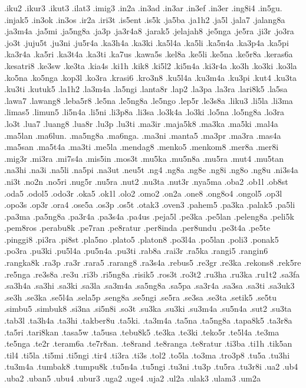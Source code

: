 {.iku2 .ikur3 .ikut3 .ilat3 .imig3 .in2a .in3ad .in3ar .in3ef .in3er
.ing8i4 .in5gu. .injak5 .in3ok .in3os .ir2a .iri3t .is5ent .is5k .ja5ba
.ja1h2 .ja5l .jala7 .jalang8a .ja3m4a .ja5mi .ja5ng8a .ja3p .ja3r4a8
.jarak5 .jelajah8 .je5nga .je5ra .ji3r .jo3ra .jo3t .juju5t .ju3ni .ju5r4a
.ka3h4a .ka3ki .ka5l4a .ka5li .ka5n4a .ka3p4a .ka5pi .ka3r4a .ka5ri
.ka3t4a .ka3ti .ka7us .kawa5s .kel8a .ke5li .ke5na .ke5r8a .keras6a
.kesatri8 .ke3sw .ke3ta .kia4s .ki1h .kik8 .ki5l2 .ki5n4a .ki3r4a .ko3h
.ko3ki .ko3la .ko5na .ko5nga .kop3l .ko3ra .krasi6 .kro3n8 .ku5l4a .ku3m4a
.ku3pi .kut4 .ku3ta .ku3ti .kutuk5 .la1h2 .la3m4a .la5ngi .lanta8r .lap2
.la3pa .la3ra .lari8k5 .la5sa .lawa7 .lawang8 .leba5r8 .le5na .le5ng8a
.le5ngo .lep5r .le3s8a .liku3 .li5la .li3ma .limas5 .limun5 .li5n4a .li5ni
.li3p8a .li3sa .lo3k4a .lo3ki .lo5na .lo5ng8a .lo3ra .lo3t .lua7 .luang8
.lua8r .lu3p .lu3ti .ma3ir .maja5k8 .ma3ka .ma5ki .mal4a .ma5lan .ma6lun.
.ma5ng8a .ma6nga. .ma3ni .manta5 .ma3pr .ma3ra .mas4a .ma5san .ma5t4a
.ma3ti .me5la .mendag8 .menko5 .menkom8 .mer8a .mer8i .mig3r .mi3ra
.mi7s4a .mis5in .mos3t .mu5ka .mu5n8a .mu5ra .mut4 .mu5tan .na3hi .na3i
.na5li .na5pi .na3ut .neu5t .ng4 .ng8a .ng8e .ng8i .ng8o .ng8u .ni3s4a
.ni3t .no2n .no5ri .nug5r .nu5ra .nut2 .nu3ta .nut3r .nya5ma .oba2 .ob1l
.ob8st .oda5 .odol5 .odo3r .oka5 .ok1l .olo2 .omo2 .on2a .one8 .ong8o4
.ongol5 .op3l .opo3s .op3r .ora4 .ose5a .os3p .os5t .otak3 .oven3 .pahem5
.pa3ka .palak5 .pa5li .pa3ma .pa5ng8a .pa3r4a .pa3s4a .pa4us .peja5l
.pe3ka .pe5lan .peleng8a .peli5k .pem8ros .perabu8k .pe7ran .pe8ratur
.per8inda .per8undu .pe3t4a .pe5te .pinggi8 .pi3ra .pi8st .pla5no .plato5
.platon8 .po3l4a .po5lan .poli3 .ponak5 .po3ra .pu3ki .pu5l4a .pu5n4a
.pu3ti .rab8a .rai3r .ra5ka .rangi5 .rangin6 .rangka8k .ra3p .ra3r .rara5
.rarang8 .ra3s4a .rebus5 .re3gr .re3ka .rekons8 .rek5re .re5nga .re3s8a
.re3u .ri3b .ri5ng8a .risik5 .ros3t .ro3t2 .ru3ha .ru3ka .ru1t2 .sa3fa
.sa3h4a .sa3hi .sa3ki .sa3la .sa3m4a .sa5ng8a .sa5pa .sa3r4a .sa3sa .sa3ti
.sa3uk3 .se3h .se3ka .se5l4a .sela5p .seng8a .se5ngi .se5ra .se3sa .se3ta
.setik5 .se5tu .simbu5 .simbuk8 .si3na .si5n8i .so3t .su3ka .su3ki .su3m4a
.su5n4a .sut2 .su3ta .tab3l .ta3h4a .ta3hi .takber8u .ta5ki. .ta3m4a
.ta5na .ta5ng8a .tapa8k5 .ta3r8a .ta5ri .tari8kan .tasa5w .ta5usa .tebu8k5
.te3ka .te3ki .teko5r .te5l4a .te3ma .te5nga .te2r .teram6a .te7r8an.
.te8rand .te8ranga .te8ratur .ti3ba .ti1h .tik5an .til4 .ti5la .ti5mi
.ti5ngi .tir4 .ti3ra .ti3s .tol2 .to5la .to3ma .tro3p8 .tu5a .tu3hi
.tu3m4a .tumbak8 .tumpu8k .tu5n4a .tu5ngi .tu3ni .tu3p .tu5ra .tu3r8i .ua2
.ub4 .uba2 .uban5 .ubu4 .ubur3 .uga2 .uge4 .uja2 .ul2a .ulak3 .ulam3 .um2a
}
